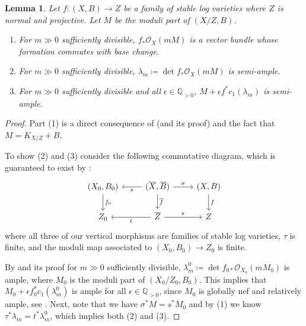 \documentclass[12pt]{amsart}
\theoremstyle{plain}
\newtheorem{lemma}[theorem]{Lemma}
\theoremstyle{definition}
\def\det{\operatorname{det}}
\def \QP {\mathbb Q_{>0}}
\begin{document}
\begin{lemma}
\label{lem_stable_max}
Let $f\colon (X, B) \rightarrow Z$ be a family of stable log varieties where $Z$ is normal and projective.  Let $M$ be the moduli part
of $(X/Z, B)$.

\begin{enumerate}
\item For $m \gg 0$ sufficiently divisible, $f_*\mathcal O_X(mM)$ is 
a vector bundle whose formation commutes with base change.

\item For $m \gg 0$ sufficiently divisible, 
$\lambda_m\coloneqq \det f_*\mathcal O_X(mM)$ is semi-ample.

\item For $m \gg 0$ sufficiently divisible and all $\epsilon \in \QP$, $M+\epsilon f^*c_1(\lambda_m)$ is semi-ample.

\end{enumerate}
\end{lemma}
\begin{proof}
Part (1) is a direct consequence of \cite[Lemma 7.7]{KP17} (and its proof) and the fact that $M = K_{X/Z}+B$.

To show (2) and (3)  consider the following commutative diagram, which is guaranteed to exist
by \cite[Corollary 6.20]{KP17}:
\begin{equation}
\begin{tikzcd}
  (X_{0}, B_0) \arrow[d, "f_0"] & \arrow[l, "s"]  (\overline{X}, \overline{B}) \arrow[r, "\sigma"] \arrow[d, "\overline{f}"] & (X, B) \arrow[d, "f"] \\
   Z_0 & \arrow[l, "t"] \overline{Z} \arrow[r, "\tau"] &  Z
 \end{tikzcd}
\end{equation}
where all three of our vertical morphisms are families of stable log varieties, $\tau$ is finite, and the moduli map associated to $(X_0, B_0) \rightarrow Z_0$ is finite.

By \cite[Corollary 7.3]{KP17} and its proof for $m \gg 0$ sufficiently divisible, 
$\lambda^0_m\coloneqq \det f_{0*}\mathcal O_{X_0}(mM_0)$ is ample, where $M_0$ is the moduli
part of $(X_0/Z_0, B_0)$.
This implies that $M_0+\epsilon f_0^*c_1(\lambda^0_m)$ is ample 
for all $\epsilon \in \QP$, since $M_0$ is globally nef and relatively ample, 
see \cite[Lemma 7.7 and proof of Theorem 7.1.1]{KP17}.
Next, note that we have $\sigma^*M = s^*M_0$ and by (1) we know $\tau^*\lambda_m = t^*\lambda^0_m$, which implies both (2) and (3).
\end{proof}
\end{document}
